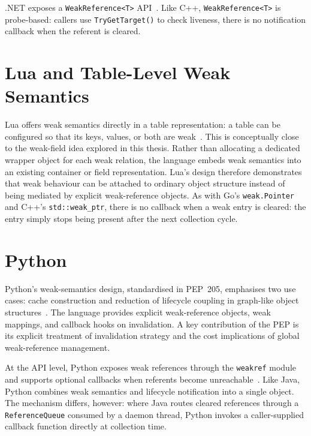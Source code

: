.NET exposes a \texttt{WeakReference<T>} \ac{API}~\cite{dotnet-weakreference}. Like C++, \texttt{WeakReference<T>} is probe-based: callers use \texttt{TryGetTarget()} to check liveness, there is no notification callback when the referent is cleared.

\section{Lua and Table-Level Weak Semantics}
\label{sec:rw-lua}

Lua offers weak semantics directly in a table representation: a table can be configured so that its keys, values, or both are weak~\cite{lua54-manual}. This is conceptually close to the weak-field idea explored in this thesis. Rather than allocating a dedicated wrapper object for each weak relation, the language embeds weak semantics into an existing container or field representation. Lua's design therefore demonstrates that weak behaviour can be attached to ordinary object structure instead of being mediated by explicit weak-reference objects. As with Go's \texttt{weak.Pointer} and C++'s \texttt{std::weak\_ptr}, there is no callback when a weak entry is cleared: the entry simply stops being present after the next collection cycle.

\section{Python}
\label{sec:rw-python}

Python's weak-semantics design, standardised in \ac{PEP}~205, emphasises two use cases: cache construction and reduction of lifecycle coupling in graph-like object structures~\cite{python-pep205}. The language provides explicit weak-reference objects, weak mappings, and callback hooks on invalidation. A key contribution of the \ac{PEP} is its explicit treatment of invalidation strategy and the cost implications of global weak-reference management.

At the \ac{API} level, Python exposes weak references through the \texttt{weakref} module and supports optional callbacks when referents become unreachable~\cite{python-weakref-docs}. Like Java, Python combines weak semantics and lifecycle notification into a single object. The mechanism differs, however: where Java routes cleared references through a \texttt{ReferenceQueue} consumed by a daemon thread, Python invokes a caller-supplied callback function directly at collection time.

